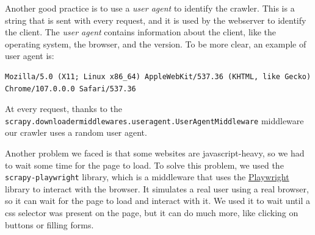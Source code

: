 \documentclass[tikz,14pt]{article}
\begin{document}
Another good practice is to use a \textit{user agent} to identify the crawler.
This is a string that is sent with every request, and it is used by the webserver to identify the client.
The \textit{user agent} contains information about the client, like the operating system, the browser, and the version.
To be more clear, an example of user agent is: 
\begin{verbatim}
Mozilla/5.0 (X11; Linux x86_64) AppleWebKit/537.36 (KHTML, like Gecko) Chrome/107.0.0.0 Safari/537.36
\end{verbatim}
At every request, thanks to the \texttt{scrapy.downloadermiddlewares.useragent.UserAgentMiddleware} middleware
our crawler uses a random user agent.

Another problem we faced is that some websites are javascript-heavy, so we had to wait some time for the page to load.
To solve this problem, we used the \verb|scrapy-playwright| library, which is a middleware that uses the \href{https://playwright.dev/}{Playwright} library to interact with the browser.
It simulates a real user using a real browser, so it can wait for the page to load and interact with it. 
We used it to wait until a css selector was present on the page, but it can do much more, like clicking on buttons or filling forms.
\end{document}
